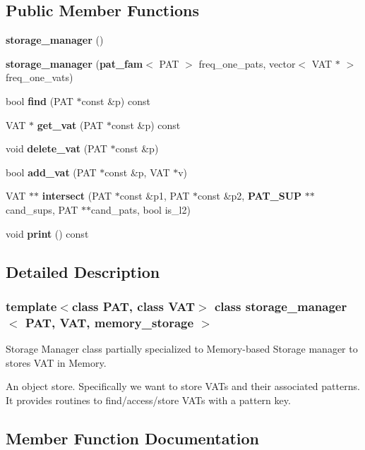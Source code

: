 \subsection*{Public Member Functions}
\begin{CompactItemize}
\item 
{\bf storage\_\-manager} ()\label{classstorage__manager_3_01PAT_00_01VAT_00_01memory__storage_01_4_a0}

\item 
{\bf storage\_\-manager} ({\bf pat\_\-fam}$<$ PAT $>$ freq\_\-one\_\-pats, vector$<$ VAT $\ast$ $>$ freq\_\-one\_\-vats)\label{classstorage__manager_3_01PAT_00_01VAT_00_01memory__storage_01_4_a1}

\item 
bool {\bf find} (PAT $\ast$const \&p) const 
\item 
VAT $\ast$ {\bf get\_\-vat} (PAT $\ast$const \&p) const 
\item 
void {\bf delete\_\-vat} (PAT $\ast$const \&p)
\item 
bool {\bf add\_\-vat} (PAT $\ast$const \&p, VAT $\ast$v)
\item 
VAT $\ast$$\ast$ {\bf intersect} (PAT $\ast$const \&p1, PAT $\ast$const \&p2, {\bf PAT\_\-SUP} $\ast$$\ast$cand\_\-sups, PAT $\ast$$\ast$cand\_\-pats, bool is\_\-l2)
\item 
void {\bf print} () const \label{classstorage__manager_3_01PAT_00_01VAT_00_01memory__storage_01_4_a7}

\end{CompactItemize}


\subsection{Detailed Description}
\subsubsection*{template$<$class PAT, class VAT$>$ class storage\_\-manager$<$ PAT, VAT, memory\_\-storage $>$}

Storage Manager class partially specialized to Memory-based Storage manager to stores VAT in Memory. 

An object store. Specifically we want to store VATs and their associated patterns. It provides routines to find/access/store VATs with a pattern key. 



\subsection{Member Function Documentation}
